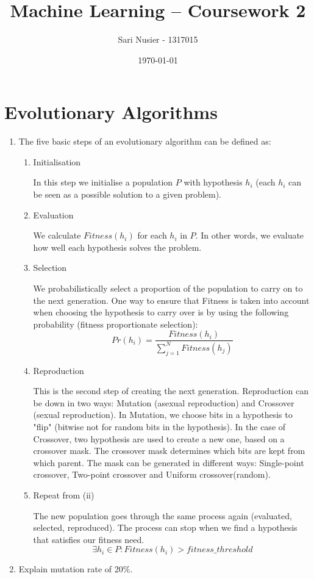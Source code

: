\documentclass[12pt,a4paper]{article}
\begin{document}
\begin{titlepage}
	\centering
	\title{Machine Learning -- Coursework 2}
	\author{Sari Nusier - 1317015}
	\date{\today}
	\maketitle
\end{titlepage}


\section{Evolutionary Algorithms}
	\begin{enumerate}[label=(\alph*)]
		\item The five basic steps of an evolutionary algorithm can be defined as:
			\begin{enumerate}[label=\roman*.]
				\item Initialisation
				
				In this step we initialise a population $P$ with hypothesis $h_i$ (each $h_i$ can be seen as a possible solution to a given problem).
				\item Evaluation
				
				We calculate $Fitness(h_i)$ for each $h_i$ in $P$. In other words, we evaluate how well each hypothesis solves the problem.
				\item Selection
				
				We probabilistically select a  proportion of the population to carry on to the next generation. One way to ensure that Fitness is taken into account when choosing the hypothesis to carry over is by using the following probability (fitness proportionate selection): \[Pr(h_i) = \frac{Fitness(h_i)}{\sum_{j=1}^{N} Fitness(h_j)}\]
				\item Reproduction
				
				This is the second step of creating the next generation. Reproduction can be down in two ways: Mutation (asexual reproduction) and Crossover (sexual reproduction).
				In Mutation, we choose bits in a hypothesis to "flip" (bitwise not for random bits in the hypothesis).
				In the case of Crossover, two hypothesis are used to create a new one, based on a crossover mask. The crossover mask determines which bits are kept from which parent. The mask can be generated in different ways: Single-point crossover, Two-point crossover and Uniform crossover(random).
				\item Repeat from (ii)
				
				The new population goes through the same process again (evaluated, selected, reproduced). The process can stop when we find a hypothesis that satisfies our fitness need. \[\exists h_i \in P:Fitness(h_i) > fitness\_threshold\]
			\end{enumerate}
		\item Explain mutation rate of 20\%.
		

\end{enumerate}
\end{document}
